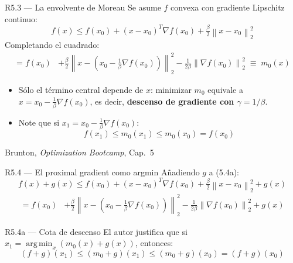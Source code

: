 \documentclass[10pt,aspectratio=169]{beamer}
\newcommand{\fuente}{\vfill{\scriptsize\color{gray}Brunton, \emph{Optimization Bootcamp}, Cap.~5}}
\newcommand{\norm}[1]{\left\lVert #1 \right\rVert}
\newcommand{\argmin}{\operatorname*{arg\,min}}
\begin{document}
\begin{frame}{R5.3 --- La envolvente de Moreau}
  \small
  Se asume $f$ convexa con gradiente Lipschitz continuo:
  \[
    f(x) \le f(x_0) + (x-x_0)^T\nabla f(x_0)
    + \tfrac{\beta}{2}\norm{x-x_0}_2^2 \tag{5.4a}
  \]
  Completando el cuadrado:
  \[
    \begin{aligned}
    = f(x_0) &+ \tfrac{\beta}{2}\norm{x - \left(x_0 - \tfrac{1}{\beta}\nabla f(x_0)\right)}_2^2
    - \tfrac{1}{2\beta}\norm{\nabla f(x_0)}_2^2 \;\equiv\; m_0(x)
    \end{aligned} \tag{5.4b}
  \]
  \begin{itemize}
    \item Sólo el término central depende de $x$: minimizar $m_0$ equivale a
      $x = x_0 - \tfrac{1}{\beta}\nabla f(x_0)$, es decir, \textbf{descenso de
      gradiente con $\gamma = 1/\beta$}.
  \item Note que si $x_1 = x_0 - \tfrac{1}{\beta}\nabla f(x_0)$:
      $$f(x_1) \leq m_0(x_1) \leq m_0(x_0)  = f(x_0)$$
  \end{itemize}
  \fuente
\end{frame}

\begin{frame}{R5.4 --- El proximal gradient como argmin}
  \small
  Añadiendo $g$ a (5.4a):
  \[
    f(x)+g(x) \le f(x_0) + (x-x_0)^T\nabla f(x_0)
    + \tfrac{\beta}{2}\norm{x-x_0}_2^2 + g(x) \tag{5.5a}
  \]
  \[
    \begin{aligned}
    = f(x_0) &+ \tfrac{\beta}{2}\norm{x - \left(x_0 - \tfrac{1}{\beta}\nabla f(x_0)\right)}_2^2
    - \tfrac{1}{2\beta}\norm{\nabla f(x_0)}_2^2 + g(x)
    \end{aligned} \tag{5.5b}
  \]
  \begin{block}{R5.4a --- Cota de descenso}
    \small
    El autor justifica que si $x_1  = \argmin_x(m_0(x) + g(x))$, entonces:
    \[
      (f+g)(x_1) \le (m_0+g)(x_1) \le (m_0+g)(x_0) = (f+g)(x_0)
    \]
  \end{block}
\end{frame}
\end{document}
